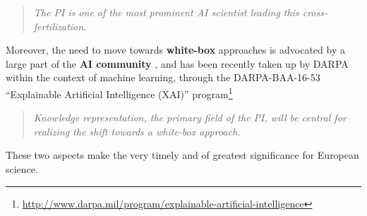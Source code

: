 \begin{quote}{\it
The PI is one of the most prominent AI scientist leading this cross-fertilization.}
\end{quote}

Moreover, the need to move towards \textbf{white-box} approaches is advocated by a large part of the \textbf{AI community} \autocite[]{RussellDT15}, and has been recently taken up by DARPA within the context of machine learning, through the DARPA-BAA-16-53 ``Explainable Artificial Intelligence (XAI)'' program\footnote{\url{http://www.darpa.mil/program/explainable-artificial-intelligence}}

\begin{quote}{\it
Knowledge representation, the primary field of the PI, will be central for realizing the shift towards a white-box approach.}
\end{quote}

These two aspects make the \project very timely and of greatest significance for European science.






